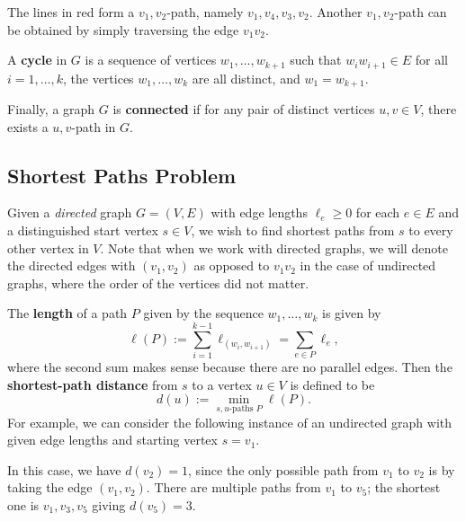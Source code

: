 The lines in red form a $v_1, v_2$-path, namely $v_1, v_4, v_3, v_2$. 
Another $v_1, v_2$-path can be obtained by simply traversing the edge $v_1v_2$. 

A {\bf cycle} in $G$ is a sequence of vertices $w_1, \dots, w_{k+1}$ 
such that $w_i w_{i+1} \in E$ for all $i = 1, \dots, k$, the vertices 
$w_1, \dots, w_k$ are all distinct, and $w_1 = w_{k+1}$.

Finally, a graph $G$ is {\bf connected} if for any pair of distinct vertices 
$u, v \in V$, there exists a $u, v$-path in $G$. 

\subsection{Shortest Paths Problem}\label{subsec:1.2}
Given a \emph{directed} graph $G = (V, E)$ with edge lengths $\ell_e \geq 0$
for each $e \in E$ and a distinguished start vertex $s \in V$, we wish 
to find shortest paths from $s$ to every other vertex in $V$. Note that 
when we work with directed graphs, we will denote the directed edges 
with $(v_1, v_2)$ as opposed to $v_1 v_2$ in the case of undirected graphs, where 
the order of the vertices did not matter. 

The {\bf length} of a path $P$ given by the sequence $w_1, \dots, w_k$ 
is given by 
\[ \ell(P) := \sum_{i=1}^{k-1} \ell_{(w_i, w_{i+1})} = \sum_{e\in P} \ell_e, \] 
where the second sum makes sense because there are no parallel edges. 
Then the {\bf shortest-path distance} from $s$ to a vertex $u \in V$ is 
defined to be
\[ d(u) := \min_{\text{$s,u$-paths $P$}} \ell(P). \] 
For example, we can consider the following instance of an undirected graph 
with given edge lengths and starting vertex $s = v_1$. 

\begin{center}
\end{center}
\vspace{-0.5cm}
In this case, we have $d(v_2) = 1$, since the only possible path from 
$v_1$ to $v_2$ is by taking the edge $(v_1, v_2)$. There are multiple
paths from $v_1$ to $v_5$; the shortest one is $v_1, v_3, v_5$ giving 
$d(v_5) = 3$. 

